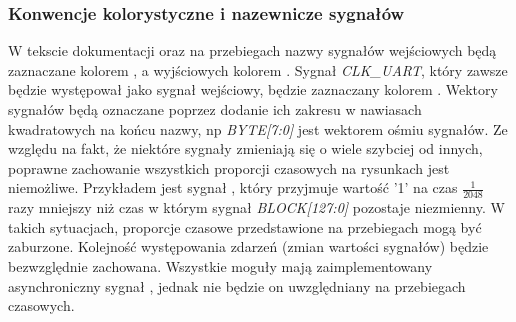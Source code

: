 \subsubsection{Konwencje kolorystyczne i nazewnicze sygnałów}
W tekscie dokumentacji oraz na przebiegach nazwy sygnałów wejściowych będą zaznaczane kolorem , a wyjściowych kolorem . Sygnał \textit{CLK\_UART}, który zawsze będzie występował jako sygnał wejściowy, będzie zaznaczany kolorem .
\break
Wektory sygnałów będą oznaczane poprzez dodanie ich zakresu w nawiasach kwadratowych na końcu nazwy, np \textit{BYTE[7:0]} jest wektorem ośmiu sygnałów.
\break
Ze względu na fakt, że niektóre sygnały zmieniają się o wiele szybciej od innych, poprawne zachowanie wszystkich proporcji czasowych na rysunkach jest niemożliwe. Przykładem jest sygnał , który przyjmuje wartość {'1'} na czas \(\frac{1}{2048}\) razy mniejszy niż czas w którym sygnał \textit{BLOCK[127:0]} pozostaje niezmienny. W takich sytuacjach, proporcje czasowe przedstawione na przebiegach mogą być zaburzone. Kolejność występowania zdarzeń (zmian wartości sygnałów) będzie bezwzględnie zachowana.
\break
Wszystkie moguły mają zaimplementowany asynchroniczny sygnał , jednak nie będzie on uwzględniany na przebiegach czasowych.
